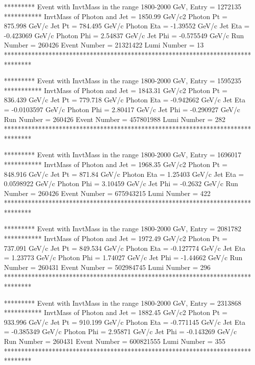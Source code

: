                                                                      
********* Event with InvtMass in the range 1800-2000 GeV, Entry = 1272135 ***********
InvtMass of Photon and Jet = 1850.99 GeV/c2
Photon Pt = 875.998 GeV/c
Jet Pt = 784.495 GeV/c
Photon Eta = -1.39552 GeV/c
Jet Eta = -0.423069 GeV/c
Photon Phi = 2.54837 GeV/c
Jet Phi = -0.575549 GeV/c
Run Number = 260426
Event Number = 21321422
Lumi Number = 13
********************************************************************************
                                                                     
                                                                     
********* Event with InvtMass in the range 1800-2000 GeV, Entry = 1595235 ***********
InvtMass of Photon and Jet = 1843.31 GeV/c2
Photon Pt = 836.439 GeV/c
Jet Pt = 779.718 GeV/c
Photon Eta = -0.942662 GeV/c
Jet Eta = -0.0103597 GeV/c
Photon Phi = 2.80417 GeV/c
Jet Phi = -0.290927 GeV/c
Run Number = 260426
Event Number = 457801988
Lumi Number = 282
********************************************************************************
                                                                     
                                                                     
********* Event with InvtMass in the range 1800-2000 GeV, Entry = 1696017 ***********
InvtMass of Photon and Jet = 1968.35 GeV/c2
Photon Pt = 848.916 GeV/c
Jet Pt = 871.84 GeV/c
Photon Eta = 1.25403 GeV/c
Jet Eta = 0.0598922 GeV/c
Photon Phi = 3.10459 GeV/c
Jet Phi = -0.2632 GeV/c
Run Number = 260426
Event Number = 675943215
Lumi Number = 422
********************************************************************************
                                                                     
                                                                     
********* Event with InvtMass in the range 1800-2000 GeV, Entry = 2081782 ***********
InvtMass of Photon and Jet = 1972.49 GeV/c2
Photon Pt = 737.091 GeV/c
Jet Pt = 849.534 GeV/c
Photon Eta = -0.127774 GeV/c
Jet Eta = 1.23773 GeV/c
Photon Phi = 1.74027 GeV/c
Jet Phi = -1.44662 GeV/c
Run Number = 260431
Event Number = 502984745
Lumi Number = 296
********************************************************************************
                                                                     
                                                                     
********* Event with InvtMass in the range 1800-2000 GeV, Entry = 2313868 ***********
InvtMass of Photon and Jet = 1882.45 GeV/c2
Photon Pt = 933.996 GeV/c
Jet Pt = 910.199 GeV/c
Photon Eta = -0.771145 GeV/c
Jet Eta = -0.385349 GeV/c
Photon Phi = 2.95871 GeV/c
Jet Phi = -0.143269 GeV/c
Run Number = 260431
Event Number = 600821555
Lumi Number = 355
********************************************************************************
                                                                     
